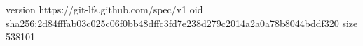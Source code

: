version https://git-lfs.github.com/spec/v1
oid sha256:2d84fffab03c025c06f0bb48dffc3fd7e238d279c2014a2a0a78b8044bddf320
size 538101
